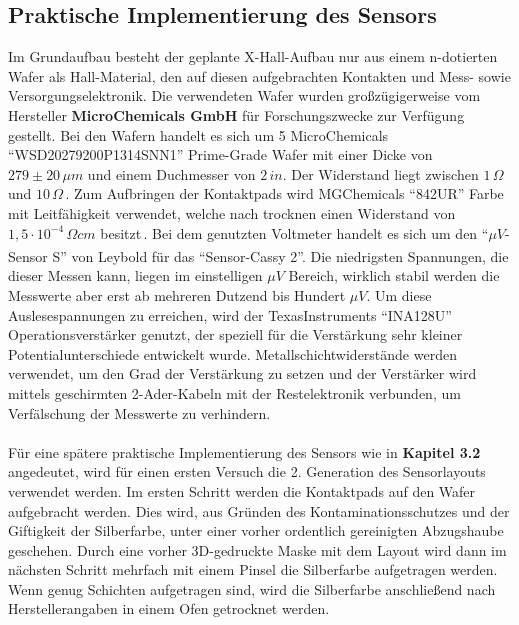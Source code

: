 \documentclass[12pt, a4paper]{article}
\begin{document}
\subsection{Praktische Implementierung des Sensors}
Im Grundaufbau besteht der geplante X-Hall-Aufbau nur aus einem n-dotierten Wafer als Hall-Material, den auf diesen aufgebrachten Kontakten und Mess- sowie Versorgungselektronik.\newline
Die verwendeten Wafer wurden großzügigerweise vom Hersteller \textbf{MicroChemicals GmbH} für Forschungszwecke zur Verfügung gestellt.\newline
Bei den Wafern handelt es sich um 5 MicroChemicals ``WSD20279200P1314SNN1'' Prime-Grade Wafer mit einer Dicke von $279\pm20\,\mu{m}$ und einem Duchmesser von $2\,in$. Der Widerstand liegt zwischen $1\,\Omega$ und $10\,\Omega$\,\cite{mcChem}.\newline
Zum Aufbringen der Kontaktpads wird MGChemicals ``842UR'' Farbe mit Leitfähigkeit verwendet, welche nach trocknen einen Widerstand von $1,5\cdot10^{-4}\,\Omega{cm}$ besitzt\,\cite{mgChem}.\newline
Bei dem genutzten Voltmeter handelt es sich um den ``$\mu{V}$-Sensor S'' von Leybold\textsuperscript{\textregistered} für das ``Sensor-Cassy 2''. Die niedrigsten Spannungen, die dieser Messen kann, liegen im einstelligen $\mu{V}$ Bereich, wirklich stabil werden die Messwerte aber erst ab mehreren Dutzend bis Hundert $\mu{V}$.\newline
Um diese Auslesespannungen zu erreichen, wird der TexasInstruments ``INA128U'' Operationsverstärker genutzt, der speziell für die Verstärkung sehr kleiner Potentialunterschiede entwickelt wurde. Metallschichtwiderstände werden verwendet, um den Grad der Verstärkung zu setzen und der Verstärker wird mittels geschirmten 2-Ader-Kabeln mit der Restelektronik verbunden, um Verfälschung der Messwerte zu verhindern.\paragraph{}
Für eine spätere praktische Implementierung des Sensors wie in \textbf{Kapitel 3.2} angedeutet, wird für einen ersten Versuch die 2. Generation des Sensorlayouts verwendet werden.\newline
Im ersten Schritt werden die Kontaktpads auf den Wafer aufgebracht werden. Dies wird, aus Gründen des Kontaminationsschutzes und der Giftigkeit der Silberfarbe, unter einer vorher ordentlich gereinigten Abzugshaube geschehen. Durch eine vorher 3D-gedruckte Maske mit dem Layout wird dann im nächsten Schritt mehrfach mit einem Pinsel die Silberfarbe aufgetragen werden. Wenn genug Schichten aufgetragen sind, wird die Silberfarbe anschließend nach Herstellerangaben in einem Ofen getrocknet werden.\newline
\end{document}
